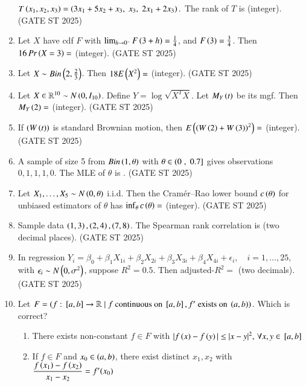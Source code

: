 \documentclass[journal,12pt,onecolumn]{IEEEtran}
\theoremstyle{remark}
\begin{document}
\begin{enumerate}
$
T\left(x_1,x_2,x_3\right) = \left(3x_1+5x_2+x_3,\; x_3,\; 2x_1+2x_3\right).
$
The rank of $T$ is \underline{\phantom{imagine}} (integer).
\hfill{(GATE ST 2025)}
\item Let $X$ have cdf $F$ with
$\lim_{h\to 0^-} F\left(3+h\right)=\tfrac{1}{4}$, and $F\left(3\right)=\tfrac{3}{4}$.
Then $16\,Pr\left(X=3\right)=$ \underline{\phantom{imagine}} (integer).
\hfill{(GATE ST 2025)}
\item Let $X\sim Bin\left(2,\tfrac{2}{3}\right)$. Then $18E\left(X^2\right)=$ \underline{\phantom{imagine}} (integer).
\hfill{(GATE ST 2025)}
\item Let $X\in \mathbb{R}^{10} \sim N\left(0,I_{10}\right)$. Define $Y=\log\!\sqrt{X^T X}$. Let $M_Y\left(t\right)$ be its mgf. Then $M_Y\left(2\right)=$ \underline{\phantom{imagine}} (integer).
\hfill{(GATE ST 2025)}
\item If $\left(W\left(t\right)\right)$ is standard Brownian motion, then $E\left(\left(W\left(2\right)+W\left(3\right)\right)^2\right)=$ \underline{\phantom{imagine}} (integer).
\hfill{(GATE ST 2025)}
\item A sample of size 5 from $Bin\left(1,\theta\right)$ with $\theta\in \left(0\right.,{}\left.0.7\right]$ gives observations $0,1,1,1,0$. The MLE of $\theta$ is \underline{\phantom{imagine}}.
\hfill{(GATE ST 2025)}
\item Let $X_1,\dots,X_5 \sim N\left(0,\theta\right)$ i.i.d. Then the Cramér--Rao lower bound $c\left(\theta\right)$ for unbiased estimators of $\theta$ has $\inf_\theta c\left(\theta\right)=$ \underline{\phantom{imagine}} (integer).
\hfill{(GATE ST 2025)}
\item Sample data $\left(1,3\right),\left(2,4\right),\left(7,8\right)$. The Spearman rank correlation is \underline{\phantom{imagine}} (two decimal places).
\hfill{(GATE ST 2025)}
\item In regression
$
Y_i=\beta_0+\beta_1X_{1i}+\beta_2X_{2i}+\beta_3X_{3i}+\beta_4X_{4i}+\epsilon_i, \quad i=1,\dots,25,
$
with $\epsilon_i\sim N\left(0,\sigma^2\right)$, suppose $R^2=0.5$. Then adjusted-$R^2=$ \underline{\phantom{imagine}} (two decimals).
\hfill{(GATE ST 2025)}
\item Let $F=\left(f:{}\left[a,b\right]\to \mathbb{R} \mid f \text{ continuous on }{}\left[a,b\right], f' \text{ exists on }\left(a,b\right)\right)$. Which is correct?
\begin{enumerate}
\item There exists non-constant $f\in F$ with $|f\left(x\right)-f\left(y\right)|\leq |x-y|^2,\,\forall x,y\in {}\left[a,b\right]$
\item If $f\in F$ and $x_0\in\left(a,b\right)$, there exist distinct $x_1,x_2$ with 
$\dfrac{f\left(x_1\right)-f\left(x_2\right)}{x_1-x_2}=f'(x_0)$

\end{enumerate}
\end{enumerate}
\end{document}
